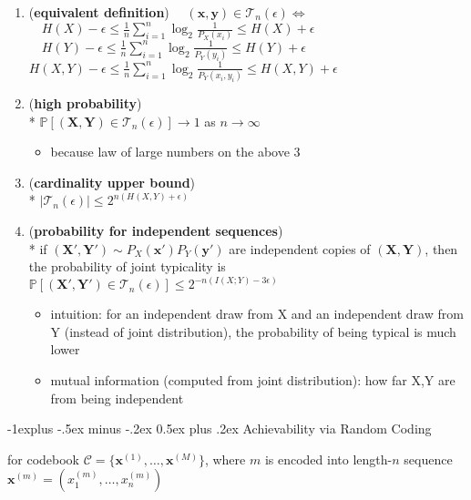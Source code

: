 \documentclass[10pt, landscape]{article}
\makeatletter
\renewcommand{\subsection}{\@startsection{subsection}{2}{0mm}%
  {-1explus -.5ex minus -.2ex}%
  {0.5ex plus .2ex}%
{\normalfont\normalsize\bfseries}}
\makeatother
\begin{document}
\begin{multicols*}{4}
  \begin{enumerate}
    \item (\textbf{equivalent definition}) $\quad(\mathbf{x}, \mathbf{y}) \in \mathcal{T}_n(\epsilon) \iff $
      $\quad H(X) - \epsilon \leq \frac{1}{n} \sum^n_{i=1} \log_2 \frac{1}{P_X(x_i)} \leq H(X) + \epsilon$
      $\quad H(Y) - \epsilon \leq \frac{1}{n} \sum^n_{i=1} \log_2 \frac{1}{P_Y(y_i)} \leq H(Y) + \epsilon$
      $H(X, Y) - \epsilon \leq \frac{1}{n} {\displaystyle{\sum^n_{i=1}}} \log_2 \frac{1}{P_Y(x_i, y_i)} \leq H(X, Y) + \epsilon$

    \item (\textbf{high probability}) \\*
      $\mathbb{P}[(\mathbf{X}, \mathbf{Y}) \in \mathcal{T}_n(\epsilon)] \to 1$ as $n \to \infty$
      \begin{itemize}
        \item because law of large numbers on the above 3 
      \end{itemize}
    \item (\textbf{cardinality upper bound}) \\*
      \( {\displaystyle{ \vert \mathcal{T}_n(\epsilon) \vert \leq 2^{n(H(X,Y)+\epsilon)} }} \) 
    \item (\textbf{probability for independent sequences}) \\*
      if $(\mathbf{X}', \mathbf{Y}') \sim P_X(\mathbf{x}')P_Y(\mathbf{y}')$ are independent copies of  $(\mathbf{X}, \mathbf{Y})$, then the probability of joint typicality is 
      $\mathbb{P}[(\mathbf{X}', \mathbf{Y}') \in \mathcal{T}_n(\epsilon)] \leq 2^{-n(I(X;Y)-3\epsilon)}$
      \begin{itemize}
        \item intuition: for an independent draw from X and an independent draw from Y (instead of joint distribution), the probability of being typical is much lower
        \item mutual information (computed from joint distribution): how far X,Y are from being independent
      \end{itemize}
  \end{enumerate}

  \subsection{Achievability via Random Coding}

  for codebook $\mathcal{C} = \{ \mathbf{x}^{(1)}, \dots, \mathbf{x}^{(M)} \}$, where $m$ is encoded into length-$n$ sequence $\mathbf{x}^{(m)} = ( x_1^{(m)}, \dots, x_n^{(m)} )$


\end{multicols*}
\end{document}
